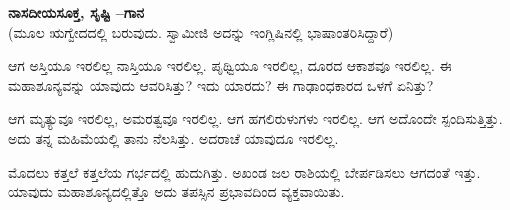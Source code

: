 \begin{myquote}
\end{myquote}

\begin{myquote}
\end{myquote}

\begin{myquote}
\end{myquote}

\begin{myquote}
\end{myquote}

\begin{center}
\textbf{ನಾಸದೀಯಸೂಕ್ತ, ಸೃಷ್ಟಿ –ಗಾನ}\\(ಮೂಲ ಋಗ್ವೇದದಲ್ಲಿ ಬರುವುದು. ಸ್ವಾಮೀಜಿ ಅದನ್ನು ಇಂಗ್ಲಿಷಿನಲ್ಲಿ ಭಾಷಾಂತರಿಸಿದ್ದಾರೆ)
\end{center}

ಆಗ ಅಸ್ತಿಯೂ ಇರಲಿಲ್ಲ ನಾಸ್ತಿಯೂ ಇರಲಿಲ್ಲ. ಪೃಥ್ವಿಯೂ ಇರಲಿಲ್ಲ, ದೂರದ ಆಕಾಶವೂ ಇರಲಿಲ್ಲ. ಈ ಮಹಾಶೂನ್ಯವನ್ನು ಯಾವುದು ಆವರಿಸಿತ್ತು? ಇದು ಯಾರದು? ಈ ಗಾಢಾಂಧಕಾರದ ಒಳಗೆ ಏನಿತ್ತು?

ಆಗ ಮೃತ್ಯುವೂ ಇರಲಿಲ್ಲ, ಅಮರತ್ವವೂ ಇರಲಿಲ್ಲ. ಆಗ ಹಗಲಿರುಳುಗಳು ಇರಲಿಲ್ಲ. ಆಗ ಅದೊಂದೇ ಸ್ಪಂದಿಸುತ್ತಿತ್ತು. ಅದು ತನ್ನ ಮಹಿಮೆಯಲ್ಲಿ ತಾನು ನೆಲಸಿತ್ತು. ಅದರಾಚೆ ಯಾವುದೂ ಇರಲಿಲ್ಲ.

ಮೊದಲು ಕತ್ತಲೆ ಕತ್ತಲೆಯ ಗರ್ಭದಲ್ಲಿ ಹುದುಗಿತ್ತು. ಅಖಂಡ ಜಲ ರಾಶಿಯಲ್ಲಿ ಬೇರ್ಪಡಿಸಲು ಆಗದಂತೆ ಇತ್ತು. ಯಾವುದು ಮಹಾಶೂನ್ಯದಲ್ಲಿತ್ತೊ ಅದು ತಪಸ್ಸಿನ ಪ್ರಭಾವದಿಂದ ವ್ಯಕ್ತವಾಯಿತು.

